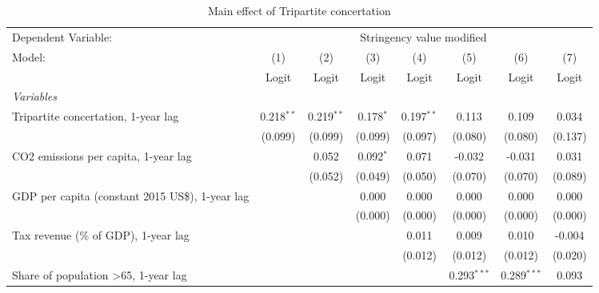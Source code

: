 
\begin{table}[htbp]
   \caption{Main effect of Tripartite concertation}
   \centering
   \begin{tabular}{lccccccc}
      \toprule
      Dependent Variable: & \multicolumn{7}{c}{Stringency value modified}\\
      Model:                                                & (1)          & (2)          & (3)         & (4)          & (5)           & (6)           & (7)\\  
                                                            &  Logit       & Logit        & Logit       & Logit        & Logit         & Logit         & Logit\\  
      \midrule
      \emph{Variables}\\
      Tripartite concertation, 1-year lag                   & 0.218$^{**}$ & 0.219$^{**}$ & 0.178$^{*}$ & 0.197$^{**}$ & 0.113         & 0.109         & 0.034\\   
                                                            & (0.099)      & (0.099)      & (0.099)     & (0.097)      & (0.080)       & (0.080)       & (0.137)\\   
      CO2 emissions per capita, 1-year lag                  &              & 0.052        & 0.092$^{*}$ & 0.071        & -0.032        & -0.031        & 0.031\\   
                                                            &              & (0.052)      & (0.049)     & (0.050)      & (0.070)       & (0.070)       & (0.089)\\   
      GDP per capita (constant 2015 US\$), 1-year lag       &              &              & 0.000       & 0.000        & 0.000         & 0.000         & 0.000\\   
                                                            &              &              & (0.000)     & (0.000)      & (0.000)       & (0.000)       & (0.000)\\   
      Tax revenue (\% of GDP), 1-year lag                   &              &              &             & 0.011        & 0.009         & 0.010         & -0.004\\   
                                                            &              &              &             & (0.012)      & (0.012)       & (0.012)       & (0.020)\\   
      Share of population >65, 1-year lag                   &              &              &             &              & 0.293$^{***}$ & 0.289$^{***}$ & 0.093\\   

\end{tabular}
\end{table}
